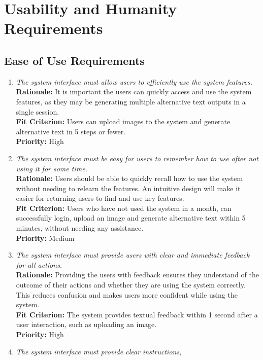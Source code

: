 \documentclass[12pt]{article}
\begin{document}
\section{Usability and Humanity Requirements}
\subsection{Ease of Use Requirements}
\begin{enumerate}[label=UHR-EUR \arabic*., wide=0pt, leftmargin=*]
  \item \emph{The system interface must allow users to efficiently
    use the system features.}\\[2mm]
    {\bf Rationale:} It is important the users can quickly access and
    use the system features, as they may be generating multiple
    alternative text outputs in a single session. \\
    {\bf Fit Criterion:} Users can upload images to the system and
    generate alternative text in 5 steps or fewer. \\
    {\bf Priority:} High
  \item \emph{The system interface must be easy for users to remember
    how to use after not using it for some time.}\\[2mm]
    {\bf Rationale:} Users should be able to quickly recall how to
    use the system without needing to relearn the features. An
    intuitive design will make it easier for returning users to find
    and use key features.  \\
    {\bf Fit Criterion:} Users who have not used the system in a
    month, can successfully login, upload an image and generate
    alternative text within 5 minutes, without needing any assistance. \\
    {\bf Priority:} Medium
  \item \emph{The system interface must provide users with clear and
    immediate feedback for all actions.}\\[2mm]
    {\bf Rationale:} Providing the users with feedback ensures they
    understand of the outcome of their actions and whether they are
    using the system correctly. This reduces confusion and makes
    users more confident while using the system. \\
    {\bf Fit Criterion:} The system provides textual feedback within
    1 second after a user interaction, such as uploading an image.  \\
    {\bf Priority:} High
  \item \emph{The system interface must provide clear instructions,
}
\end{enumerate}
\end{document}
